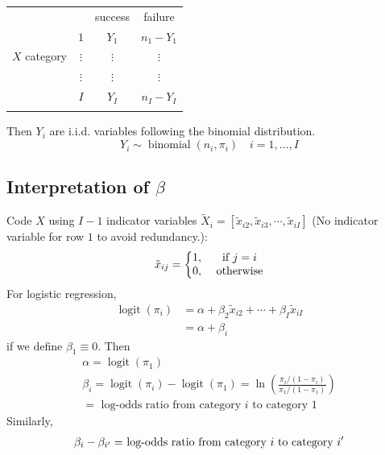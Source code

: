 \documentclass[11pt]{elegantbook}
\begin{document}
\begin{center}
    \begin{tabular}{cc|c|c|}
        \multicolumn{2}{c}{ } & \multicolumn{1}{c}{ success } & \multicolumn{1}{c}{ failure } \\
        \cline { 3 - 4 } & $1$ & $Y_1$ & $n_1-Y_1$ \\
        $X$ category & $\vdots$ & $\vdots$ & $\vdots$ \\
        & $\vdots$ & $\vdots$ & $\vdots$ \\
        & $I$ & $Y_I$ & $n_I-Y_I$ \\
        \cline { 3 - 4 }
        \multicolumn{2}{c}{ } & \multicolumn{1}{c}{ } & \multicolumn{1}{c}{} \\
    \end{tabular}
\end{center}
Then $Y_i$ are i.i.d. variables following the binomial distribution.
$$
Y_i \sim \operatorname{binomial}\left(n_i, \pi_i\right) \quad i=1, \ldots, I
$$
\subsection{Interpretation of $\beta$}
Code $X$ using $I - 1$ indicator variables $\tilde{X}_i=[\tilde{x}_{i2},\tilde{x}_{i3},\cdots,\tilde{x}_{iI}]$ (No indicator variable for row $1$ to avoid redundancy.):
\begin{equation}
    \begin{aligned}
        \tilde{x}_{ij}=\left\{\begin{matrix}
            1,&\textnormal{ if }j=i\\
            0,&\textnormal{ otherwise}
        \end{matrix}\right.
    \end{aligned}
    \nonumber
\end{equation}
For logistic regression,
$$
\begin{aligned}
\operatorname{logit}\left(\pi_i\right) & =\alpha+\beta_2 \tilde{x}_{i 2}+\cdots+\beta_I \tilde{x}_{i I} \\
& =\alpha+\beta_i
\end{aligned}
$$
if we define $\beta_1 \equiv 0$. Then
$$
\begin{gathered}
\alpha=\operatorname{logit}\left(\pi_1\right) \\
\beta_i=\operatorname{logit}\left(\pi_i\right)-\operatorname{logit}\left(\pi_1\right)=\ln \left(\frac{\pi_i /\left(1-\pi_i\right)}{\pi_1 /\left(1-\pi_1\right)}\right) \\
=\text { log-odds ratio from category } i \text { to category } 1
\end{gathered}
$$
Similarly,
\begin{equation}
    \begin{aligned}
        \textnormal{$\beta_i-\beta_{i^{\prime}}=$ log-odds ratio from category $i$ to category $i^{\prime}$}
    \end{aligned}
    \nonumber
\end{equation}
\end{document}
